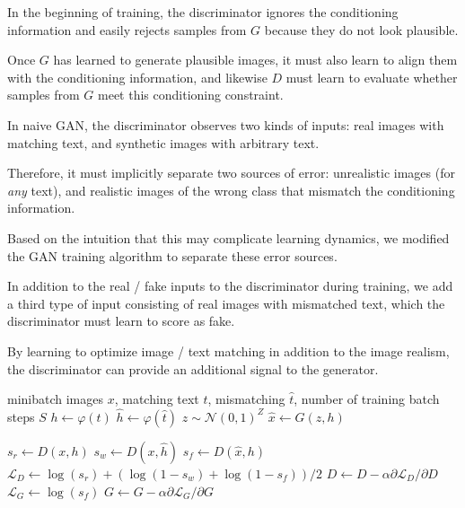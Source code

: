 In the beginning of training, the discriminator ignores the conditioning information and easily rejects samples from $G$ because they do not look plausible.

Once $G$ has learned to generate plausible images, it must also learn to align them with the conditioning information, and likewise $D$ must learn to evaluate whether samples from $G$ meet this conditioning constraint.

In naive GAN, the discriminator observes two kinds of inputs: real images with matching text, and synthetic images with arbitrary text.

Therefore, it must implicitly separate two sources of error: unrealistic images (for \emph{any} text), and realistic images of the wrong class that mismatch the conditioning information. 

Based on the intuition that this may complicate learning dynamics, we modified the GAN training algorithm to separate these error sources.

In addition to the real / fake inputs to the discriminator during training, we add a third type of input consisting of real images with mismatched text, which the discriminator must learn to score as fake.

By learning to optimize image / text matching in addition to the image realism, the discriminator can provide an additional signal to the generator.

\begin{algorithm}[t]
	\begin{algorithmic}[1]
		 minibatch images $x$, matching text $t$, mismatching $\hat{t}$, number of training batch steps $S$
		\STATE $h \gets \varphi(t)$ 
		\STATE $\hat{h} \gets \varphi(\hat{t})$ 
		\STATE $z \sim \mathcal{N}(0,1)^{Z}$ 
		\STATE $\hat{x} \gets G(z, h)$ 

		\STATE $s_{r} \gets D(x, h)$ 
		\STATE $s_{w} \gets D(x, \hat{h})$ 
		\STATE $s_{f} \gets D(\hat{x}, h)$ 
		\STATE $\mathcal{L}_{D} \gets \log(s_{r}) + (\log(1-s_{w}) + \log(1-s_{f})) / 2$
		\STATE $D \gets D - \alpha \partial{\mathcal{L}}_{D} / \partial D$ 
		\STATE $\mathcal{L}_G \gets \log(s_{f})$
		\STATE $G \gets G - \alpha \partial{\mathcal{L}}_G / \partial G$ 
		\ENDFOR
	\end{algorithmic}
	\caption{GAN-CLS training algorithm with step size $\alpha$, using minibatch SGD for simplicity.\label{alg:training}}
\end{algorithm}

